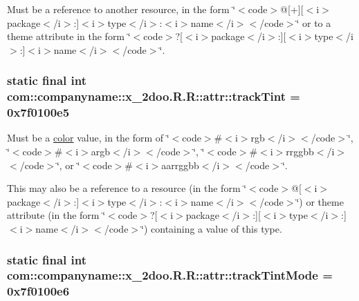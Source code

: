 Must be a reference to another resource, in the form \char`\"{}$<$code$>$@\mbox{[}+\mbox{]}\mbox{[}$<$i$>$package$<$/i$>$:\mbox{]}$<$i$>$type$<$/i$>$:$<$i$>$name$<$/i$>$$<$/code$>$\char`\"{} or to a theme attribute in the form \char`\"{}$<$code$>$?\mbox{[}$<$i$>$package$<$/i$>$:\mbox{]}\mbox{[}$<$i$>$type$<$/i$>$:\mbox{]}$<$i$>$name$<$/i$>$$<$/code$>$\char`\"{}. \hypertarget{classcom_1_1companyname_1_1x__2doo_1_1_r_1_1attr_4e09abbece43caf8fd5e77207b47d7f1}{
\subsubsection[{trackTint}]{\setlength{\rightskip}{0pt plus 5cm}static final int com::companyname::x\_\-2doo.R.R::attr::trackTint = 0x7f0100e5}}
\label{classcom_1_1companyname_1_1x__2doo_1_1_r_1_1attr_4e09abbece43caf8fd5e77207b47d7f1}


Must be a \hyperlink{classcom_1_1companyname_1_1x__2doo_1_1_r_1_1color}{color} value, in the form of \char`\"{}$<$code$>$\#$<$i$>$rgb$<$/i$>$$<$/code$>$\char`\"{}, \char`\"{}$<$code$>$\#$<$i$>$argb$<$/i$>$$<$/code$>$\char`\"{}, \char`\"{}$<$code$>$\#$<$i$>$rrggbb$<$/i$>$$<$/code$>$\char`\"{}, or \char`\"{}$<$code$>$\#$<$i$>$aarrggbb$<$/i$>$$<$/code$>$\char`\"{}. 

This may also be a reference to a resource (in the form \char`\"{}$<$code$>$@\mbox{[}$<$i$>$package$<$/i$>$:\mbox{]}$<$i$>$type$<$/i$>$:$<$i$>$name$<$/i$>$$<$/code$>$\char`\"{}) or theme attribute (in the form \char`\"{}$<$code$>$?\mbox{[}$<$i$>$package$<$/i$>$:\mbox{]}\mbox{[}$<$i$>$type$<$/i$>$:\mbox{]}$<$i$>$name$<$/i$>$$<$/code$>$\char`\"{}) containing a value of this type. \hypertarget{classcom_1_1companyname_1_1x__2doo_1_1_r_1_1attr_7a4dd405e28b37f253244028762d079f}{
\subsubsection[{trackTintMode}]{\setlength{\rightskip}{0pt plus 5cm}static final int com::companyname::x\_\-2doo.R.R::attr::trackTintMode = 0x7f0100e6}}
\label{classcom_1_1companyname_1_1x__2doo_1_1_r_1_1attr_7a4dd405e28b37f253244028762d079f}


